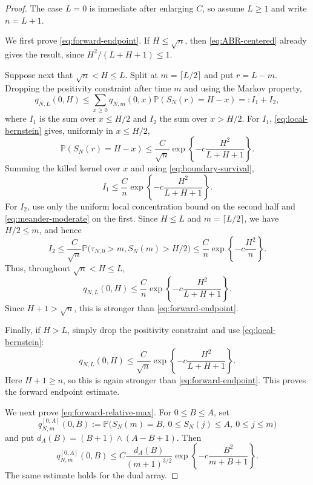 \documentclass[11pt]{article}
\theoremstyle{plain}
\theoremstyle{definition}
\theoremstyle{remark}
\newcommand{\Pp}{\mathbb P}
\begin{document}
\begin{proof}
The case \(L=0\) is immediate after enlarging \(C\), so assume \(L\ge1\)
and write \(n=L+1\).

We first prove \eqref{eq:forward-endpoint}. If \(H\le\sqrt n\), then
\eqref{eq:ABR-centered} already gives the result, since
\(H^2/(L+H+1)\le1\).

Suppose next that \(\sqrt n<H\le L\). Split at
\(m=\lceil L/2\rceil\) and put \(r=L-m\). Dropping the positivity
constraint after time \(m\) and using the Markov property,
\[
 q_{N,L}(0,H)
 \le \sum_{x\ge0}q_{N,m}(0,x)\Pp(S_N(r)=H-x)
 =:I_1+I_2,
\]
where \(I_1\) is the sum over \(x\le H/2\) and \(I_2\) the sum over
\(x>H/2\). For \(I_1\), \eqref{eq:local-bernstein} gives, uniformly in
\(x\le H/2\),
\[
 \Pp(S_N(r)=H-x)
 \le \frac{C}{\sqrt n}
 \exp\left\{-c\frac{H^2}{L+H+1}\right\}.
\]
Summing the killed kernel over \(x\) and using
\eqref{eq:boundary-survival},
\[
 I_1
 \le \frac{C}{n}
 \exp\left\{-c\frac{H^2}{L+H+1}\right\}.
\]
For \(I_2\), use only the uniform local concentration bound on the second
half and \eqref{eq:meander-moderate} on the first. Since \(H\le L\) and
\(m=\lceil L/2\rceil\), we have \(H/2\le m\), and hence
\[
 I_2
 \le \frac{C}{\sqrt n}
 \Pp\bigl(\tau_{N,0}>m,S_N(m)>H/2\bigr)
 \le \frac{C}{n}
 \exp\left\{-c\frac{H^2}{n}\right\}.
\]
Thus, throughout \(\sqrt n<H\le L\),
\[
 q_{N,L}(0,H)
 \le \frac{C}{n}
 \exp\left\{-c\frac{H^2}{L+H+1}\right\}.
\]
Since \(H+1>\sqrt n\), this is stronger than
\eqref{eq:forward-endpoint}.

Finally, if \(H>L\), simply drop the positivity constraint and use
\eqref{eq:local-bernstein}:
\[
 q_{N,L}(0,H)
 \le \frac{C}{\sqrt n}
 \exp\left\{-c\frac{H^2}{L+H+1}\right\}.
\]
Here \(H+1\ge n\), so this is again stronger than
\eqref{eq:forward-endpoint}. This proves the forward endpoint estimate.


We next prove \eqref{eq:forward-relative-max}. For \(0\le B\le A\), set
\[
 q_{N,m}^{[0,A]}(0,B)
 :=\Pp\bigl(S_N(m)=B,\ 0\le S_N(j)\le A,\ 0\le j\le m\bigr)
\]
and put \(d_A(B)=(B+1)\wedge(A-B+1)\).  Then
\begin{equation}
 q_{N,m}^{[0,A]}(0,B)
 \le C\frac{d_A(B)}{(m+1)^{3/2}}
 \exp\left\{-c\frac{B^2}{m+B+1}\right\}.
 \label{eq:strip-endpoint-short}
\end{equation}
The same estimate holds for the dual array.


\end{proof}
\end{document}

